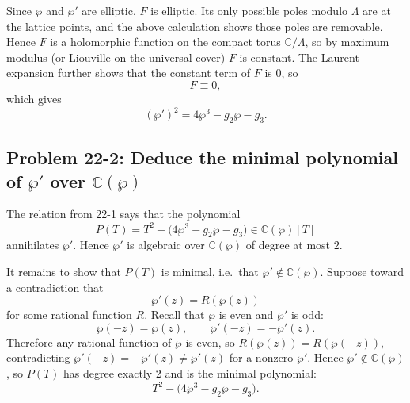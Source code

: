 \documentclass[11pt]{article}
\newcommand{\C}{\mathbb{C}}
\begin{document}
Since $\wp$ and $\wp'$ are elliptic, $F$ is elliptic. Its only possible poles modulo $\Lambda$ are at the lattice points, and the above calculation shows those poles are removable. Hence $F$ is a holomorphic function on the compact torus $\C/\Lambda$, so by maximum modulus (or Liouville on the universal cover) $F$ is constant. The Laurent expansion further shows that the constant term of $F$ is $0$, so
\[
 F\equiv0,
\]
which gives
\[
 \boxed{(\wp')^2=4\wp^3-g_2\wp-g_3.}
\]

\subsection*{Problem 22-2: Deduce the minimal polynomial of $\wp'$ over $\C(\wp)$}

The relation from 22-1 says that the polynomial
\[
 P(T)=T^2-\bigl(4\wp^3-g_2\wp-g_3\bigr)\in\C(\wp)[T]
\]
annihilates $\wp'$. Hence $\wp'$ is algebraic over $\C(\wp)$ of degree at most $2$.

It remains to show that $P(T)$ is minimal, i.e.\ that $\wp'\notin\C(\wp)$. Suppose toward a contradiction that
\[
 \wp'(z)=R(\wp(z))
\]
for some rational function $R$. Recall that $\wp$ is even and $\wp'$ is odd:
\[
 \wp(-z)=\wp(z),\qquad \wp'(-z)=-\wp'(z).
\]
Therefore any rational function of $\wp$ is even, so $R(\wp(z))=R(\wp(-z))$, contradicting $\wp'(-z)=-\wp'(z)\neq\wp'(z)$ for a nonzero $\wp'$. Hence $\wp'\notin\C(\wp)$, so $P(T)$ has degree exactly $2$ and is the minimal polynomial:
\[
 \boxed{T^2-\bigl(4\wp^3-g_2\wp-g_3\bigr).}
\]
\end{document}
